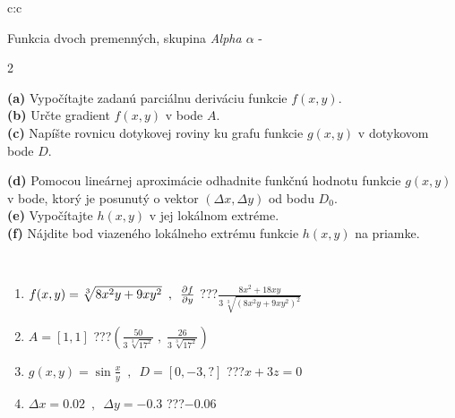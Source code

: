 \documentclass[10pt]{report}
\begin{document}
\thispagestyle{empty}
\begin{tabular}{c:c}
\begin{minipage}[c][104.5mm][t]{0.5\linewidth}
\begin{center}
\vspace{7mm}
{\huge \LARGE Funkcia dvoch premenných, skupina \textit{Alpha $\alpha$} -}\\[5mm]
\begin{minipage}{0.95\linewidth}
\begin{center}
{\small \begin{multicols}{2} \raggedright
\textbf{(a)} Vypočítajte zadanú parciálnu deriváciu funkcie \(f(x,y)\). \\[1mm]
\textbf{(b)} Určte gradient \(f(x,y)\) v bode \(A\). \\[1mm]
\textbf{(c)} Napíšte rovnicu dotykovej roviny ku grafu funkcie \(g(x,y)\) v dotykovom bode \(D\). \par \columnbreak
\textbf{(d)} Pomocou lineárnej aproximácie odhadnite funkčnú hodnotu funkcie \(g(x,y)\) v bode, ktorý je posunutý o vektor \((\Delta x, \Delta y)\) od bodu \(D_0\). \\[1mm]
\textbf{(e)} Vypočítajte \(h(x,y)\) v jej lokálnom extréme. \\[1mm]
\textbf{(f)} Nájdite bod viazeného lokálneho extrému funkcie \(h(x,y)\) na priamke. \\[1mm]
\end{multicols}
}
\end{center}
\end{minipage}
\\[4mm]
\begin{minipage}{0.79\linewidth}
\begin{center}
\begin{varwidth}{\linewidth}
\begin{enumerate}
\normalsizerr
\item $f(x,y) = \sqrt[3]{8x^2y + 9xy^2}\enspace , \enspace \pdv{f}{y}$\quad \dotfill\; ???\;\dotfill \quad $\frac{8x^2+18xy}{3\,\sqrt[3]{(8x^2y+9xy^2)^{2}}}$
\item $A = [1, 1]$\quad \dotfill\; ???\;\dotfill \quad $\left( \frac{50}{3\,\sqrt[3]{17^2}} \;,\; \frac{26}{3\,\sqrt[3]{17^2}} \right)$
\item $g(x,y) = \sin\frac{x}{y} \enspace , \enspace D = [0, -3, ?]$\quad \dotfill\; ???\;\dotfill \quad $x+3z=0$
\item $\Delta x = {0.02} \enspace,\enspace \Delta y = {-0.3}$\quad \dotfill\; ???\;\dotfill \quad $-0.06$

\end{enumerate}
\end{varwidth}
\end{center}
\end{minipage}
\end{center}
\end{minipage}
\end{tabular}
\end{document}

